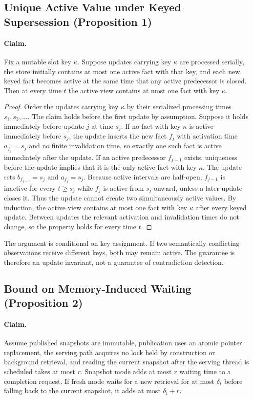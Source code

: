 \documentclass[letterpaper]{article} %
\begin{document}
\subsection{Unique Active Value under Keyed Supersession (Proposition 1)}

\paragraph{Claim.} Fix a mutable slot key $\kappa$. Suppose updates carrying key $\kappa$ are processed serially, the store initially contains at most one active fact with that key, and each new keyed fact becomes active at the same time that any active predecessor is closed. Then at every time $t$ the active view contains at most one fact with key $\kappa$.

\begin{proof}
Order the updates carrying key $\kappa$ by their serialized processing times $s_1,s_2,\ldots$. The claim holds before the first update by assumption. Suppose it holds immediately before update $j$ at time $s_j$. If no fact with key $\kappa$ is active immediately before $s_j$, the update inserts the new fact $f_j$ with activation time $a_{f_j}=s_j$ and no finite invalidation time, so exactly one such fact is active immediately after the update. If an active predecessor $f_{j-1}$ exists, uniqueness before the update implies that it is the only active fact with key $\kappa$. The update sets $b_{f_{j-1}}=s_j$ and $a_{f_j}=s_j$. Because active intervals are half-open, $f_{j-1}$ is inactive for every $t\ge s_j$ while $f_j$ is active from $s_j$ onward, unless a later update closes it. Thus the update cannot create two simultaneously active values. By induction, the active view contains at most one fact with key $\kappa$ after every keyed update. Between updates the relevant activation and invalidation times do not change, so the property holds for every time $t$.
\end{proof}

The argument is conditional on key assignment. If two semantically conflicting observations receive different keys, both may remain active. The guarantee is therefore an update invariant, not a guarantee of contradiction detection.

\subsection{Bound on Memory-Induced Waiting (Proposition 2)}

\paragraph{Claim.} Assume published snapshots are immutable, publication uses an atomic pointer replacement, the serving path acquires no lock held by construction or background retrieval, and reading the current snapshot after the serving thread is scheduled takes at most $r$. Snapshot mode adds at most $r$ waiting time to a completion request. If fresh mode waits for a new retrieval for at most $\delta_t$ before falling back to the current snapshot, it adds at most $\delta_t+r$.
\end{document}

